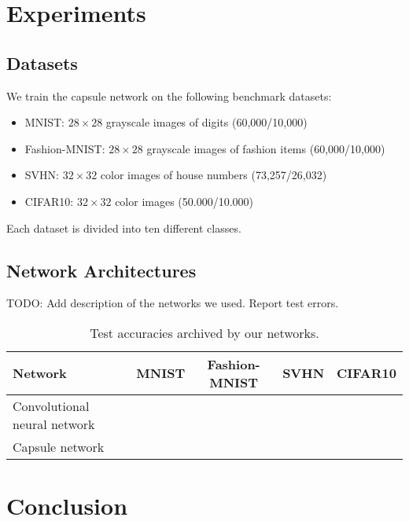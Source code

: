 \documentclass{article}
\begin{document}
\section{Experiments}
\label{lab:experiments}

\subsection{Datasets}

We train the capsule network on the following benchmark datasets:
\begin{itemize}
	\item MNIST: $28\times28$ grayscale images of digits (60,000/10,000) \cite{mnist}
	\item Fashion-MNIST:  $28\times28$ grayscale images of fashion items (60,000/10,000) \cite{fashion}
	\item SVHN: $32\times32$ color images of house numbers (73,257/26,032) \cite{svhn}
	\item CIFAR10: $32\times32$ color images (50.000/10.000) \cite{cifar}
\end{itemize}
Each dataset is divided into ten different classes.

\subsection{Network Architectures}
TODO: Add description of the networks we used. Report test errors.

\begin{table}[h]
	\centering
	\begin{tabular}{lcccc}
		Network       & MNIST & Fashion-MNIST & SVHN & CIFAR10  \\
		\toprule
		Convolutional neural network &  &  &  &  \\
		Capsule network            &  &  &  &  \\
		
	\end{tabular}
\label{tab:accuracies}
\caption{Test accuracies archived by our networks.}
\end{table}
\section{Conclusion}




\end{document}
